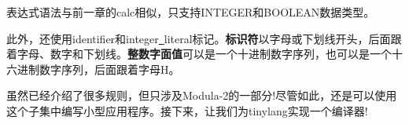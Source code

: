 表达式语法与前一章的calc相似，只支持INTEGER和BOOLEAN数据类型。\par

此外，还使用identifier和integer\underline{~}literal标记。\textbf{标识符}以字母或下划线开头，后面跟着字母、数字和下划线。\textbf{整数字面值}可以是一个十进制数字序列，也可以是一个十六进制数字序列，后面跟着字母H。\par

虽然已经介绍了很多规则，但只涉及Modula-2的一部分!尽管如此，还是可以使用这个子集中编写小型应用程序。接下来，让我们为tinylang实现一个编译器!\par



















